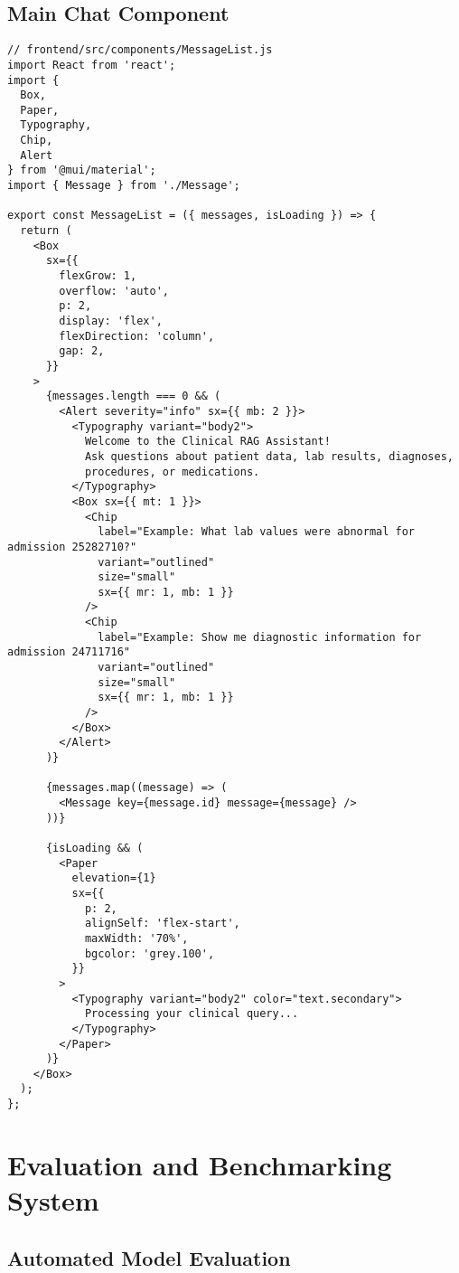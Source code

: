 \subsection{Main Chat Component}

\begin{verbatim}
// frontend/src/components/MessageList.js
import React from 'react';
import { 
  Box, 
  Paper, 
  Typography, 
  Chip, 
  Alert 
} from '@mui/material';
import { Message } from './Message';

export const MessageList = ({ messages, isLoading }) => {
  return (
    <Box
      sx={{
        flexGrow: 1,
        overflow: 'auto',
        p: 2,
        display: 'flex',
        flexDirection: 'column',
        gap: 2,
      }}
    >
      {messages.length === 0 && (
        <Alert severity="info" sx={{ mb: 2 }}>
          <Typography variant="body2">
            Welcome to the Clinical RAG Assistant! 
            Ask questions about patient data, lab results, diagnoses, 
            procedures, or medications.
          </Typography>
          <Box sx={{ mt: 1 }}>
            <Chip 
              label="Example: What lab values were abnormal for admission 25282710?" 
              variant="outlined" 
              size="small"
              sx={{ mr: 1, mb: 1 }}
            />
            <Chip 
              label="Example: Show me diagnostic information for admission 24711716" 
              variant="outlined" 
              size="small"
              sx={{ mr: 1, mb: 1 }}
            />
          </Box>
        </Alert>
      )}

      {messages.map((message) => (
        <Message key={message.id} message={message} />
      ))}

      {isLoading && (
        <Paper
          elevation={1}
          sx={{
            p: 2,
            alignSelf: 'flex-start',
            maxWidth: '70%',
            bgcolor: 'grey.100',
          }}
        >
          <Typography variant="body2" color="text.secondary">
            Processing your clinical query...
          </Typography>
        </Paper>
      )}
    </Box>
  );
};
\end{verbatim}

\section{Evaluation and Benchmarking System}

\subsection{Automated Model Evaluation}

